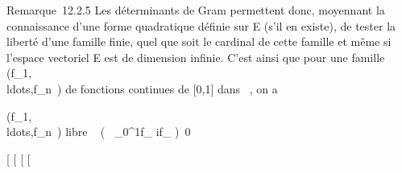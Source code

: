 \documentclass[]{article}
\begin{document}
Remarque~12.2.5 Les déterminants de Gram permettent donc, moyennant la
connaissance d'une forme quadratique définie sur E (s'il en existe), de
tester la liberté d'une famille finie, quel que soit le cardinal de
cette famille et même si l'espace vectoriel E est de dimension infinie.
C'est ainsi que pour une famille
(f\_1,\\ldots,f\_n~)
de fonctions continues de {[}0,1{]} dans ~, on a

(f\_1,\\ldots,f\_n~)\text
libre  \Leftrightarrow
{}~
\left (\int ~
\_0^1f\_ if\_\jmath\right
)\neq~0

{[}
{[}
{[}
{[}
\end{document}
